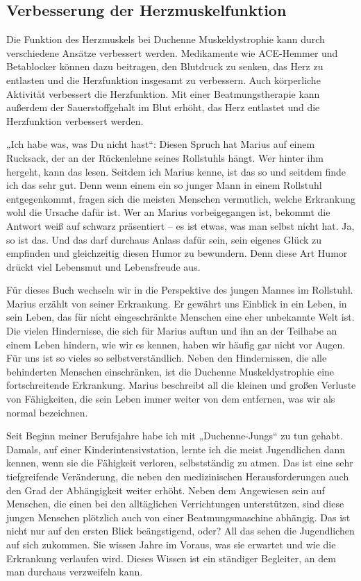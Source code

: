 \documentclass[fontsize=14pt,a4paper,headinclude,DIV=calc,automark]{scrbook}
\begin{document}
\subsection{Verbesserung der Herzmuskelfunktion}

Die Funktion des Herzmuskels bei Duchenne Muskeldystrophie kann durch verschiedene Ansätze verbessert werden. Medikamente wie ACE-Hemmer und Betablocker können dazu beitragen, den Blutdruck zu senken, das Herz zu entlasten und die Herzfunktion insgesamt zu verbessern. Auch körperliche Aktivität verbessert die Herzfunktion. Mit einer Beatmungstherapie kann außerdem der Sauerstoffgehalt im Blut erhöht, das Herz entlastet und die Herzfunktion verbessert werden.

\thispagestyle{scrheadings} %

\leavevmode
\normalsize

„Ich habe was, was Du nicht hast“: Diesen Spruch hat Marius auf einem Rucksack, der an der Rückenlehne seines Rollstuhls hängt. Wer hinter ihm hergeht, kann das lesen. Seitdem ich Marius kenne, ist das so und seitdem finde ich das sehr gut. Denn wenn einem ein so junger Mann in einem Rollstuhl entgegenkommt, fragen sich die meisten Menschen vermutlich, welche Erkrankung wohl die Ursache dafür ist. Wer an Marius vorbeigegangen ist, bekommt die Antwort weiß auf schwarz präsentiert – es ist etwas, was man selbst nicht hat. Ja, so ist das. Und das darf durchaus Anlass dafür sein, sein eigenes Glück zu empfinden und gleichzeitig diesen Humor zu bewundern. Denn diese Art Humor drückt viel Lebensmut und Lebensfreude aus.

Für dieses Buch wechseln wir in die Perspektive des jungen Mannes im Rollstuhl. Marius erzählt von seiner Erkrankung. Er gewährt uns Einblick in ein Leben, in sein Leben, das für nicht eingeschränkte Menschen eine eher unbekannte Welt ist. Die vielen Hindernisse, die sich für Marius auftun und ihn an der Teilhabe an einem Leben hindern, wie wir es kennen, haben wir häufig gar nicht vor Augen. Für uns ist so vieles so selbstverständlich. Neben den Hindernissen, die alle behinderten Menschen einschränken, ist die Duchenne Muskeldystrophie eine fortschreitende Erkrankung. Marius beschreibt all die kleinen und großen Verluste von Fähigkeiten, die sein Leben immer weiter von dem entfernen, was wir als normal bezeichnen.

Seit Beginn meiner Berufsjahre habe ich mit „Duchenne-Jungs“ zu tun gehabt. Damals, auf einer Kinderintensivstation, lernte ich die meist Jugendlichen dann kennen, wenn sie die Fähigkeit verloren, selbstständig zu atmen. Das ist eine sehr tiefgreifende Veränderung, die neben den medizinischen Herausforderungen auch den Grad der Abhängigkeit weiter erhöht. Neben dem Angewiesen sein auf Menschen, die einen bei den alltäglichen Verrichtungen unterstützen, sind diese jungen Menschen plötzlich auch von einer Beatmungsmaschine abhängig. Das ist nicht nur auf den ersten Blick beängstigend, oder? All das sehen die Jugendlichen auf sich zukommen. Sie wissen Jahre im Voraus, was sie erwartet und wie die Erkrankung verlaufen wird. Dieses Wissen ist ein ständiger Begleiter, an dem man durchaus verzweifeln kann.
\end{document}
